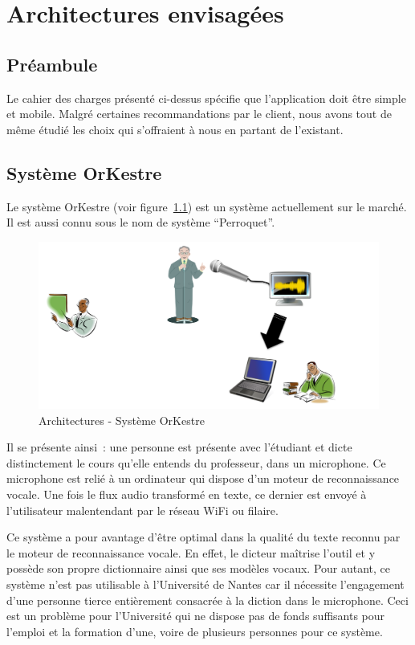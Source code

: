 \chapter{Architectures envisagées}
\minitoc

\section{Préambule}
Le cahier des charges présenté ci-dessus spécifie que l'application doit être
simple et mobile. Malgré certaines recommandations par le client, nous avons
tout de même étudié les choix qui s'offraient à nous en partant de l'existant.

\section{Système OrKestre}

Le système OrKestre (voir figure~\ref{fig:orkestre}) est un système actuellement sur le marché. Il est aussi
connu sous le nom de système ``Perroquet''.


\begin{figure}[h]
 \centering
 \includegraphics[scale=0.5]{./images/orKestre.png}
 \caption{Architectures - Système OrKestre}
 \label{fig:orkestre}
\end{figure}

Il se présente ainsi~: une personne est présente avec l'étudiant et dicte distinctement le cours qu'elle entends du professeur, dans un microphone. Ce microphone est relié à un ordinateur qui dispose d'un moteur de reconnaissance vocale. Une fois le flux audio transformé en texte, ce dernier est envoyé à l'utilisateur malentendant par le réseau WiFi ou filaire.

Ce système a pour avantage d'être optimal dans la qualité du texte reconnu par le moteur de reconnaissance vocale. En effet, le dicteur maîtrise l'outil et y possède son propre dictionnaire ainsi que ses modèles vocaux. 
Pour autant, ce système n'est pas utilisable à l'Université de Nantes car il nécessite l'engagement d'une personne tierce entièrement consacrée à la diction dans le microphone. Ceci est un problème pour l'Université qui ne dispose pas de fonds suffisants pour l'emploi et la formation d'une, voire de plusieurs personnes pour ce système.

